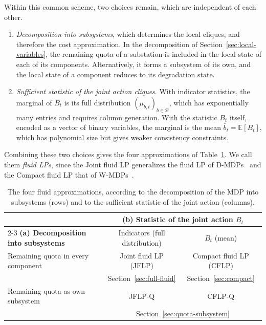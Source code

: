 \documentclass{article}
\begin{document}
Within this common scheme, two choices remain, which are independent of each other.
\begin{enumerate}[label=(\alph*)]
  \item \emph{Decomposition into subsystems}, which determines the local cliques, and therefore the cost
        approximation. In the decomposition of Section~\ref{sec:local-variables}, the remaining quota of a substation is
        included in the local state of each of its components. Alternatively, it forms a subsystem of its own, and the
        local state of a component reduces to its degradation state.
  \item \emph{Sufficient statistic of the joint action cliques}. With indicator statistics, the marginal of $B_t$ is
        its full distribution $(\mu_{b,t})_{b\in\mathcal{B}}$, which has exponentially many entries and requires column
        generation. With the statistic $B_t$ itself, encoded as a vector of binary variables, the marginal is the mean
        $\bar b_t = \mathbb{E}[B_t]$, which has polynomial size but gives weaker consistency constraints.
\end{enumerate}
Combining these two choices gives the four approximations of Table~\ref{tab:approximations}. We call them \emph{fluid
LPs}, since the Joint fluid LP generalizes the fluid LP of D-MDPs~\cite{bertsimas2016} and the Compact fluid LP that of
W-MDPs~\cite{AdelmanMersereau2008}.

\begin{table}[h]
\centering
\small
\renewcommand{\arraystretch}{1.2}
\begin{tabular}{|l|c|c|}
\hline
 & \multicolumn{2}{c|}{\textbf{(b) Statistic of the joint action $B_t$}} \\
\cline{2-3}
\textbf{(a) Decomposition into subsystems} & Indicators (full distribution) & $B_t$ (mean) \\
\hline
Remaining quota in every component & Joint fluid LP (JFLP) & Compact fluid LP (CFLP) \\
 & Section~\ref{sec:full-fluid} & Section~\ref{sec:compact} \\
\hline
Remaining quota as own subsystem & JFLP-Q & CFLP-Q \\
 & \multicolumn{2}{c|}{Section~\ref{sec:quota-subsystem}} \\
\hline
\end{tabular}
\caption{The four fluid approximations, according to the decomposition of the MDP into subsystems (rows) and to the
sufficient statistic of the joint action (columns).}
\label{tab:approximations}
\end{table}
\end{document}
